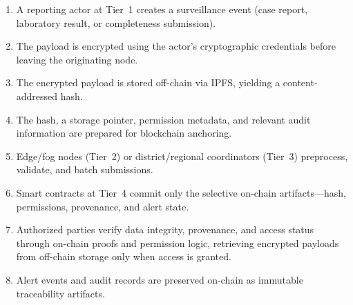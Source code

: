 \documentclass[AMA,LATO1COL]{WileyNJD-v2}
\begin{document}
%
%

\begin{enumerate}
\item A reporting actor at Tier~1 creates a surveillance event (case report, laboratory result, or completeness submission).
\item The payload is encrypted using the actor's cryptographic credentials before leaving the originating node.
\item The encrypted payload is stored off-chain via IPFS, yielding a content-addressed hash.
\item The hash, a storage pointer, permission metadata, and relevant audit information are prepared for blockchain anchoring.
\item Edge/fog nodes (Tier~2) or district/regional coordinators (Tier~3) preprocess, validate, and batch submissions.
\item Smart contracts at Tier~4 commit only the selective on-chain artifacts---hash, permissions, provenance, and alert state.
\item Authorized parties verify data integrity, provenance, and access status through on-chain proofs and permission logic, retrieving encrypted payloads from off-chain storage only when access is granted.
\item Alert events and audit records are preserved on-chain as immutable traceability artifacts.
\end{enumerate}
\end{document}
